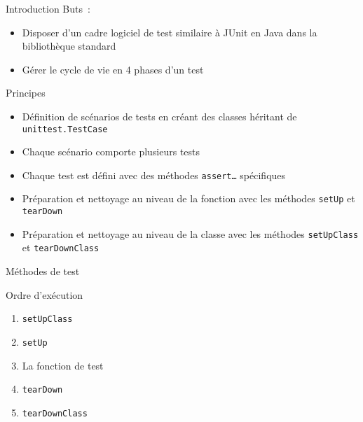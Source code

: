 \begin{frame}{Introduction}
  Buts~:

  \begin{itemize}[<+->]
    \item Disposer d'un cadre logiciel de test similaire à JUnit en Java dans la bibliothèque standard
    \item Gérer le cycle de vie en 4 phases d'un test
  \end{itemize}
\end{frame}

\begin{frame}{Principes}
  \begin{itemize}[<+->]
    \item Définition de scénarios de tests en créant des classes héritant de \texttt{unittest.TestCase}
    \item Chaque scénario comporte plusieurs tests
    \item Chaque test est défini avec des méthodes \texttt{assert…} spécifiques
    \item Préparation et nettoyage au niveau de la fonction avec les méthodes \texttt{setUp} et \texttt{tearDown}
    \item Préparation et nettoyage au niveau de la classe avec les méthodes \texttt{setUpClass} et \texttt{tearDownClass}
  \end{itemize}
\end{frame}

\begin{frame}{Méthodes de test}
\end{frame}

\begin{frame}{Ordre d'exécution}

  \begin{enumerate}[<+->]
    \item \texttt{setUpClass}
    \item \texttt{setUp}
    \item La fonction de test
    \item \texttt{tearDown}
    \item \texttt{tearDownClass}
  \end{enumerate}

\end{frame}

